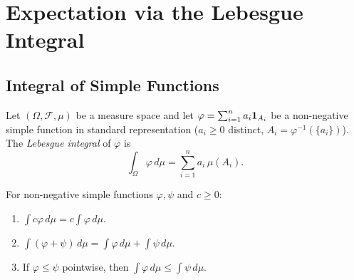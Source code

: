 \documentclass[11pt,a4paper]{article}
\begin{document}

\section{Expectation via the Lebesgue Integral}
\label{sec:expectation}

\subsection{Integral of Simple Functions}
\label{subsec:integral_simple}

\begin{definition}
\label{def:integral_simple}
Let $(\Omega, \mathcal{F}, \mu)$ be a measure space and let
$\varphi = \sum_{i=1}^n a_i \mathbf{1}_{A_i}$ be a non-negative simple
function in standard representation ($a_i \geq 0$ distinct,
$A_i = \varphi^{-1}(\{a_i\})$). The \emph{Lebesgue integral} of $\varphi$
is
\begin{equation}
  \int_\Omega \varphi\, d\mu = \sum_{i=1}^n a_i\, \mu(A_i).
  \label{eq:integral_simple}
\end{equation}
\end{definition}

\begin{proposition}
\label{prop:simple_integral_props}
For non-negative simple functions $\varphi, \psi$ and $c \geq 0$:
\begin{enumerate}[nosep,label=(\alph*)]
  \item $\int c\varphi\, d\mu = c \int \varphi\, d\mu$.
  \item $\int (\varphi + \psi)\, d\mu
    = \int \varphi\, d\mu + \int \psi\, d\mu$.
  \item If $\varphi \leq \psi$ pointwise, then
    $\int \varphi\, d\mu \leq \int \psi\, d\mu$.
\end{enumerate}
\end{proposition}
\end{document}
